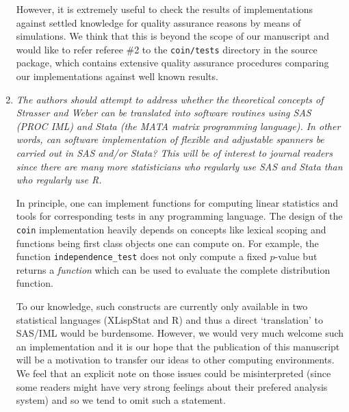 \documentclass[11pt]{article}
\begin{document}
\begin{enumerate}
However, it is extremely useful to check the results of implementations
against settled knowledge for quality assurance reasons by means of
simulations. We
think that this is beyond the scope of our manuscript and would like to
refer referee \#2 to the \texttt{coin/tests} directory in the source
package, which contains extensive quality assurance procedures comparing our
implementations against well known results.

\item \textsl{The authors should attempt to address whether the theoretical concepts of
              Strasser and Weber can be translated into software routines using 
              SAS (PROC IML) and Stata (the MATA matrix programming language). In other 
              words, can software implementation of flexible and adjustable
              spanners be carried out in SAS and/or Stata? This will be of interest to
              journal readers since there are many more statisticians who regularly use 
              SAS and Stata than who regularly use R.}

In principle, one can implement functions for computing linear statistics
and tools for corresponding tests in any programming language. The design of
the \texttt{coin} implementation heavily depends on concepts like lexical
scoping and functions being first class objects one can compute on. For
example, the function \texttt{independence\_test} does not only compute a
fixed $p$-value but returns a \textit{function} which can be used to
evaluate the complete distribution function.

To our knowledge, such constructs are currently only available in two
statistical languages (\textsf{XLispStat} and \textsf{R}) and thus a direct
`translation' to \textsf{SAS/IML} would be burdensome. However, we would
very much welcome such an implementation and it is our hope that the
publication of this manuscript will be a motivation to transfer our ideas
to other computing environments. We feel that an explicit note on those
issues could be misinterpreted (since some readers might have very strong 
feelings about their prefered analysis system) and so we tend to omit 
such a statement.

\end{enumerate}
\end{document}
